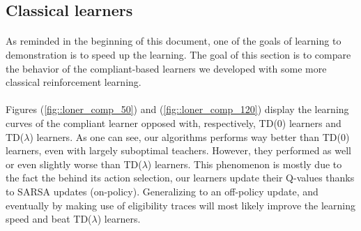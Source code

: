 \documentclass[a4paper]{report}
\begin{document}
{{		\subsection{Classical learners}
		{
			\paragraph{} As reminded in the beginning of this document, one of the goals of learning to demonstration is to speed up the learning. The goal of this section is to compare the behavior of the compliant-based learners we developed with some more classical reinforcement learning. 
			
			\paragraph{} Figures (\ref{fig::loner_comp_50}) and (\ref{fig::loner_comp_120}) display the learning curves of the compliant learner opposed with, respectively, TD(0) learners and TD($\lambda$) learners. As one can see, our algorithms performs way better than TD(0) learners, even with largely suboptimal teachers. However, they performed as well or even slightly worse than TD($\lambda$) learners. This phenomenon is mostly due to the fact the behind its action selection, our learners update their Q-values thanks to SARSA updates (on-policy). Generalizing to an off-policy update, and eventually by making use of eligibility traces will most likely improve the learning speed and beat TD($\lambda$) learners. 
							
}}}
\end{document}

